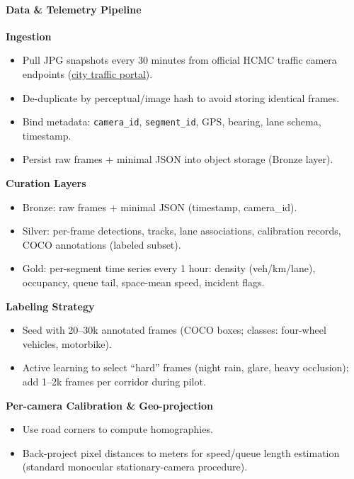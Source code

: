 \paragraph{Data \& Telemetry Pipeline}

\mbox{}\newline
	\textbf{Ingestion}
\begin{itemize}
  \item Pull JPG snapshots every 30 minutes from official HCMC traffic camera endpoints (\href{https://giaothong.hochiminhcity.gov.vn/Map.aspx}{city traffic portal}).
  \item De-duplicate by perceptual/image hash to avoid storing identical frames.
  \item Bind metadata: \texttt{camera\_id}, \texttt{segment\_id}, GPS, bearing, lane schema, timestamp.
  \item Persist raw frames + minimal JSON into object storage (Bronze layer).
\end{itemize}
  \textbf{Curation Layers}
\begin{itemize}
  \item Bronze: raw frames + minimal JSON (timestamp, camera\_id).
  \item Silver: per-frame detections, tracks, lane associations, calibration records, COCO annotations (labeled subset).
  \item Gold: per-segment time series every 1 hour: density (veh/km/lane), occupancy, queue tail, space-mean speed, incident flags.
\end{itemize}
	\textbf{Labeling Strategy}
\begin{itemize}
  \item Seed with 20--30k annotated frames (COCO boxes; classes: four-wheel vehicles, motorbike).
  \item Active learning to select ``hard'' frames (night rain, glare, heavy occlusion); add 1--2k frames per corridor during pilot.
\end{itemize}
	\textbf{Per-camera Calibration \& Geo-projection}
\begin{itemize}
  \item Use road corners to compute homographies.
  \item Back-project pixel distances to meters for speed/queue length estimation (standard monocular stationary-camera procedure).
\end{itemize}

